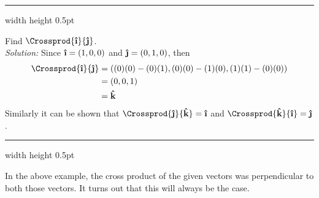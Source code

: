 
\hrule width \textwidth height 0.5pt
\piccaption[]{}
\begin{exmp}\label{exmp:crossijk}
 Find $\Crossprod{\boldsymbol{\hat{\textbf{\i}}}}{\boldsymbol{\hat{\textbf{\j}}}}$.\vspace{2mm}\\\emph{Solution:}
 Since $\boldsymbol{\hat{\textbf{\i}}} = (1,0,0)$ and $\boldsymbol{\hat{\textbf{\j}}} = (0,1,0)$, then
 \begin{align*}
  \Crossprod{\boldsymbol{\hat{\textbf{\i}}}}{\boldsymbol{\hat{\textbf{\j}}}} &= ((0)(0) - (0)(1),(0)(0) - (1)(0),(1)(1) - (0)(0))\\
  &= (0,0,1)\\
  &= \boldsymbol{\hat{\textbf{k}}}
 \end{align*}
Similarly it can be shown that $\Crossprod{\boldsymbol{\hat{\textbf{\j}}}}{\boldsymbol{\hat{\textbf{k}}}} = \boldsymbol{\hat{\textbf{\i}}}$ and
$\Crossprod{\boldsymbol{\hat{\textbf{k}}}}{\boldsymbol{\hat{\textbf{\i}}}} = \boldsymbol{\hat{\textbf{\j}}}$.
\end{exmp}
\hrule width \textwidth height 0.5pt
\vspace{4mm}

In the above example, the cross product of the given vectors was perpendicular to both those vectors. It
turns out that this will always be the case.

